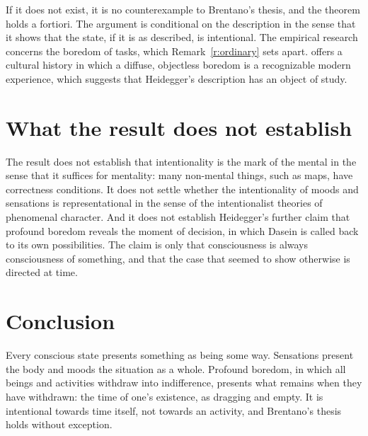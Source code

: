 \documentclass{situationist-preprint}
\begin{document}
\begin{reply}
If it does not exist, it is no counterexample to Brentano's thesis, and the theorem holds a fortiori. The argument is conditional on the description in the sense that it shows that the state, if it is as described, is intentional. The empirical research concerns the boredom of tasks, which Remark~\ref{r:ordinary} sets apart. \citet{Svendsen2005} offers a cultural history in which a diffuse, objectless boredom is a recognizable modern experience, which suggests that Heidegger's description has an object of study.
\end{reply}

\section{What the result does not establish}

The result does not establish that intentionality is the mark of the mental in the sense that it suffices for mentality: many non-mental things, such as maps, have correctness conditions. It does not settle whether the intentionality of moods and sensations is representational in the sense of the intentionalist theories of phenomenal character. And it does not establish Heidegger's further claim that profound boredom reveals the moment of decision, in which Dasein is called back to its own possibilities. The claim is only that consciousness is always consciousness of something, and that the case that seemed to show otherwise is directed at time.

\section{Conclusion}

Every conscious state presents something as being some way. Sensations present the body and moods the situation as a whole. Profound boredom, in which all beings and activities withdraw into indifference, presents what remains when they have withdrawn: the time of one's existence, as dragging and empty. It is intentional towards time itself, not towards an activity, and Brentano's thesis holds without exception.
\end{document}
